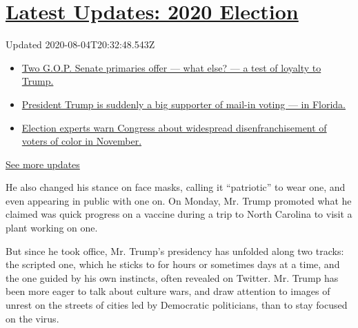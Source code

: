 \hypertarget{latest-updates-2020-election}{%
\section{\texorpdfstring{\href{https://www.nytimes.com/2020/08/04/us/elections/primary-election-michigan-arizona-kansas.html?action=click\&pgtype=Article\&state=default\&region=MAIN_CONTENT_1\&context=storylines_live_updates}{Latest
Updates: 2020
Election}}{Latest Updates: 2020 Election}}\label{latest-updates-2020-election}}

Updated 2020-08-04T20:32:48.543Z

\begin{itemize}
\tightlist
\item
  \href{https://www.nytimes.com/2020/08/04/us/elections/primary-election-michigan-arizona-kansas.html?action=click\&pgtype=Article\&state=default\&region=MAIN_CONTENT_1\&context=storylines_live_updates\#link-3924dd44}{Two
  G.O.P. Senate primaries offer --- what else? --- a test of loyalty to
  Trump.}
\item
  \href{https://www.nytimes.com/2020/08/04/us/elections/primary-election-michigan-arizona-kansas.html?action=click\&pgtype=Article\&state=default\&region=MAIN_CONTENT_1\&context=storylines_live_updates\#link-32b39e33}{President
  Trump is suddenly a big supporter of mail-in voting --- in Florida.}
\item
  \href{https://www.nytimes.com/2020/08/04/us/elections/primary-election-michigan-arizona-kansas.html?action=click\&pgtype=Article\&state=default\&region=MAIN_CONTENT_1\&context=storylines_live_updates\#link-6d019753}{Election
  experts warn Congress about widespread disenfranchisement of voters of
  color in November.}
\end{itemize}

\href{https://www.nytimes.com/2020/08/04/us/elections/primary-election-michigan-arizona-kansas.html?action=click\&pgtype=Article\&state=default\&region=MAIN_CONTENT_1\&context=storylines_live_updates}{See
more updates}

He also changed his stance on face masks, calling it ``patriotic'' to
wear one, and even appearing in public with one on. On Monday, Mr. Trump
promoted what he claimed was quick progress on a vaccine during a trip
to North Carolina to visit a plant working on one.

But since he took office, Mr. Trump's presidency has unfolded along two
tracks: the scripted one, which he sticks to for hours or sometimes days
at a time, and the one guided by his own instincts, often revealed on
Twitter. Mr. Trump has been more eager to talk about culture wars, and
draw attention to images of unrest on the streets of cities led by
Democratic politicians, than to stay focused on the virus.

